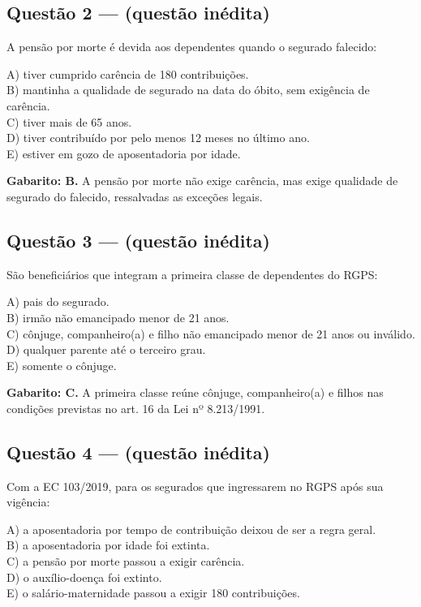 \documentclass[11pt,a4paper]{article}
\begin{document}
\subsection*{Questão 2 — (questão inédita)}

A pensão por morte é devida aos dependentes quando o segurado falecido:

A) tiver cumprido carência de 180 contribuições. \\ B) mantinha a qualidade de segurado na data do óbito, sem exigência de carência. \\ C) tiver mais de 65 anos. \\ D) tiver contribuído por pelo menos 12 meses no último ano. \\ E) estiver em gozo de aposentadoria por idade.

\begin{alerta}
\textbf{Gabarito: B.} A pensão por morte não exige carência, mas exige qualidade de segurado do falecido, ressalvadas as exceções legais.
\end{alerta}

\subsection*{Questão 3 — (questão inédita)}

São beneficiários que integram a primeira classe de dependentes do RGPS:

A) pais do segurado. \\ B) irmão não emancipado menor de 21 anos. \\ C) cônjuge, companheiro(a) e filho não emancipado menor de 21 anos ou inválido. \\ D) qualquer parente até o terceiro grau. \\ E) somente o cônjuge.

\begin{alerta}
\textbf{Gabarito: C.} A primeira classe reúne cônjuge, companheiro(a) e filhos nas condições previstas no art. 16 da Lei nº 8.213/1991.
\end{alerta}

\subsection*{Questão 4 — (questão inédita)}

Com a EC 103/2019, para os segurados que ingressarem no RGPS após sua vigência:

A) a aposentadoria por tempo de contribuição deixou de ser a regra geral. \\ B) a aposentadoria por idade foi extinta. \\ C) a pensão por morte passou a exigir carência. \\ D) o auxílio-doença foi extinto. \\ E) o salário-maternidade passou a exigir 180 contribuições.
\end{document}
